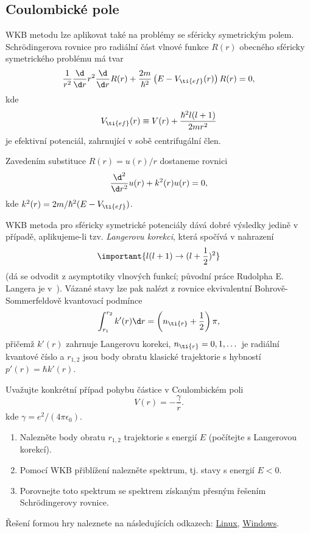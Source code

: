 \subsection{Coulombické pole}	
    WKB metodu lze aplikovat také na problémy se sféricky symetrickým polem.
    Schrödingerova rovnice pro radiální část vlnové funkce $R(r)$ obecného sféricky symetrického problému má tvar
    \begin{equation}
        \frac{1}{r^{2}}\frac{\d}{\d r}r^{2}\frac{\d}{\d r}R(r)+\frac{2m}{\hbar^{2}}\left(E-V_{\ti{ef}}(r)\right)R(r)
            =0,
    \end{equation}
    kde 
    \begin{equation}
    V_{\ti{ef}}(r)
        \equiv V(r)+\frac{\hbar^{2}l(l+1)}{2mr^{2}}
    \end{equation}
    je efektivní potenciál, zahrnující v sobě centrifugální člen.
    
    Zavedením substituce $R(r)=u(r)/r$ dostaneme rovnici
    \begin{equation}
        \frac{\d^{2}}{\d r^{2}}u(r)+k^{2}(r)u(r)
            =0,
    \end{equation}
    kde $k^{2}(r)=2m/\hbar^{2}(E-V_{\ti{ef}})$.
    
    WKB metoda pro sféricky symetrické potenciály dává dobré výsledky jedině v případě, 
    aplikujeme-li tzv. \emph{Langerovu korekci}, která spočívá v nahrazení 
    \begin{equation}
        \important{l(l+1)\rightarrow(l+\frac{1}{2})^{2}}
    \end{equation}
    (dá se odvodit z asymptotiky vlnových funkcí; původní práce Rudolpha E. Langera je v~\cite{Langer1937}).
    Vázané stavy lze pak nalézt z rovnice ekvivalentní Bohrově-Sommerfeldově kvantovací podmínce
    \begin{equation}
        \int_{r_{1}}^{r_{2}}k'(r)\d r
            =\left(n_{\ti{r}}+\frac{1}{2}\right)\pi,
    \end{equation}
    přičemž $k'(r)$ zahrnuje Langerovu korekci, $n_{\ti{r}}=0,1,\dots$ je radiální kvantové číslo a
    $r_{1,2}$ jsou body obratu klasické trajektorie s hybností $p'(r)=\hbar k'(r)$.
    
    Uvažujte konkrétní případ pohybu částice v Coulombickém poli
    \begin{equation}
        V(r)=-\frac{\gamma}{r}.
    \end{equation}
    kde $\gamma=e^{2}/(4\pi\epsilon_{0})$.
    
    \begin{enumerate}
        \item 
            Nalezněte body obratu $r_{1,2}$ trajektorie s energií $E$ (počítejte s Langerovou korekcí).
        
        \item 
            Pomocí WKB přiblížení nalezněte spektrum, tj. stavy s energií $E<0$.
        
        \item
            Porovnejte toto spektrum se spektrem získaným přesným řešením Schrödingerovy rovnice.
    \end{enumerate}

    \begin{solution}
        Řešení formou hry naleznete na následujících odkazech:
        \href{http://pavelstransky.cz/cviceniktvt/WKBLanger_1.1_linux.zip}{Linux},
        \href{http://pavelstransky.cz/cviceniktvt/WKBLanger_1.1_windows.zip}{Windows}.
    \end{solution}
